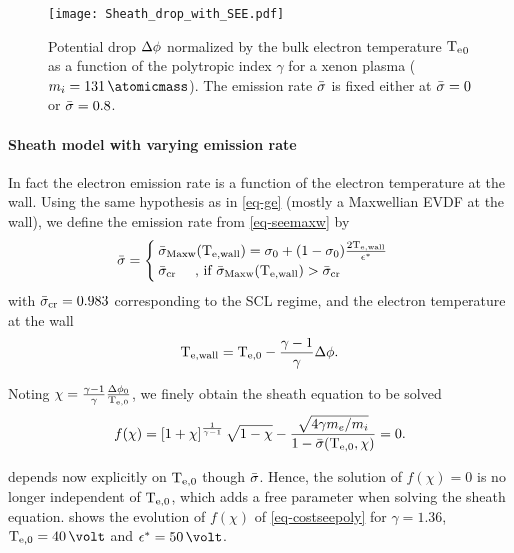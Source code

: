 \begin{figure}[!hbt]
  \centering
  \texttt{[image: Sheath\_drop\_with\_SEE.pdf]}
  \caption{Potential drop $\Delta \phi$ normalized by the bulk electron temperature $\mathrm{T_e}_0$ as a function of the polytropic index $\gamma$ for a xenon plasma ($m_i = 131\,\atomicmass$). The emission rate $ \bar{\sigma }$ is fixed either at $ \bar{\sigma }=0$ or $ \bar{\sigma }=0.8$.}
  \label{fig-dphi_see}
\end{figure}

\paragraph{Sheath model with varying emission rate\\}

In fact the electron emission rate is a function of the electron temperature at the wall.
Using the same hypothesis as in \cref{eq-ge} (mostly a Maxwellian \ac{EVDF} at the wall), we define the emission rate from \cref{eq-seemaxw} by
\begin{equation} \label{eq-seemaxw_poly}
   \bar{\sigma } = 
  \begin{cases}
     \bar{\sigma }_{\rm Maxw}(\mathrm{T_{e, wall}}) =  \sigma_0 + ( 1 - \sigma_0) \frac{ 2 \mathrm{T_{e, wall}}  }{\epsilon^{*}} \\
     \bar{\sigma }_{\rm cr} \text{ \quad, if }  \bar{\sigma }_{\rm Maxw}(\mathrm{T_{e, wall}}) >  \bar{\sigma }_{\rm cr}
  \end{cases}
\end{equation}
with $ \bar{\sigma }_{\rm cr} = 0.983$ corresponding to the \ac{SCL} regime, and the electron temperature at the wall
\begin{equation} \label{eq-Tewall}
  \mathrm{T_{e, wall}} = \mathrm{T_{e, 0}} - \frac{\gamma - 1}{\gamma } \Delta \phi.
\end{equation}


Noting $\chi = \frac{\gamma -1}{\gamma} \frac{ \Delta \phi_0}{ \mathrm{T_{e, 0}}} $, we finely obtain the sheath equation to be solved
\begin{equation} \label{eq-costseepoly}
  f(\chi) = \left[ 1 + \chi  \right]^{\frac{1}{\gamma - 1}} \sqrt{1 - \chi} - \frac{  \sqrt{4 \gamma m_e / m_i}}{1 -  \bar{\sigma } (\mathrm{T_{e, 0}}, \chi )} = 0.
\end{equation}

 depends now explicitly on $\mathrm{T_{e, 0}}$ though $ \bar{\sigma }$.
Hence, the solution of $f(\chi)=0$ is no longer independent of $\mathrm{T_{e, 0}}$, which adds a free parameter when solving the sheath equation.
 shows the evolution of $f(\chi)$ of \cref{eq-costseepoly} for $\gamma = 1.36$, $\Teb=40\,\volt$ and $\crover=50\,\volt$.

